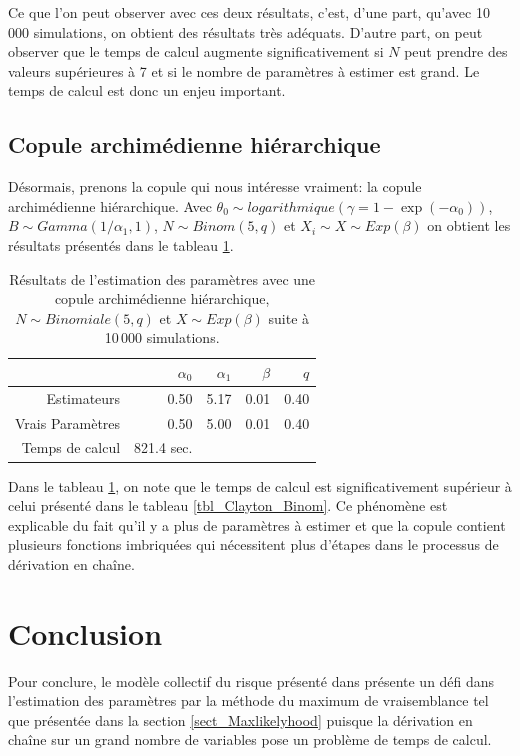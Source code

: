 \documentclass{article}
\begin{document}
			
		Ce que l'on peut observer avec ces deux résultats, c'est, d'une part, qu'avec 10\,000 simulations, on obtient des résultats très adéquats. D'autre part, on peut observer que le temps de calcul augmente significativement si $N$ peut prendre des valeurs supérieures à 7 et si le nombre de paramètres à estimer est grand. Le temps de calcul est donc un enjeu important.

	\subsection{Copule archimédienne hiérarchique}
		Désormais, prenons la copule qui nous intéresse vraiment: la copule archimédienne hiérarchique. Avec $\theta_0 \sim logarithmique\left(\gamma = 1-\exp(-\alpha_0)\right)$, $B \sim Gamma(1/\alpha_1, 1)$, $N \sim Binom(5,q)$ et $X_i \sim X \sim Exp(\beta)$ on obtient les résultats présentés dans le tableau \ref{tbl_archi_hierar}.
		\begin{table}[H]
			\centering
			\begin{tabular}{rrrrr}
				\hline
				& $\alpha_{0}$ & $\alpha_{1}$ & $\beta$ & $q$ \\ 
				\hline
				Estimateurs & 0.50 & 5.17 & 0.01 & 0.40 \\ 
				Vrais Paramètres & 0.50 & 5.00 & 0.01 & 0.40 \\ 
				\hline
				Temps de calcul & 821.4 sec. \\
				\hline
			\end{tabular}
			\caption[Estimations avec une copule archimédienne hiérarchique et $N\sim Binomiale$]{Résultats de l'estimation des paramètres avec une copule archimédienne hiérarchique, $N \sim Binomiale(5, q)$ et $X \sim Exp(\beta)$ suite à 10\,000 simulations.} 
			\label{tbl_archi_hierar}
		\end{table}
	
		Dans le tableau \ref{tbl_archi_hierar}, on note que le temps de calcul est significativement supérieur à celui présenté dans le tableau \ref{tbl_Clayton_Binom}. Ce phénomène est explicable du fait qu'il y a plus de paramètres à estimer et que la copule contient plusieurs fonctions imbriquées qui nécessitent plus d'étapes dans le processus de dérivation en chaîne.
		
	\section{Conclusion}
		Pour conclure, le modèle collectif du risque présenté dans \cite{Itre5} présente un défi dans l'estimation des paramètres par la méthode du maximum de vraisemblance tel que présentée dans la section \ref{sect_Maxlikelyhood} puisque la dérivation en chaîne sur un grand nombre de variables pose un problème de temps de calcul.\\
		
\end{document}
